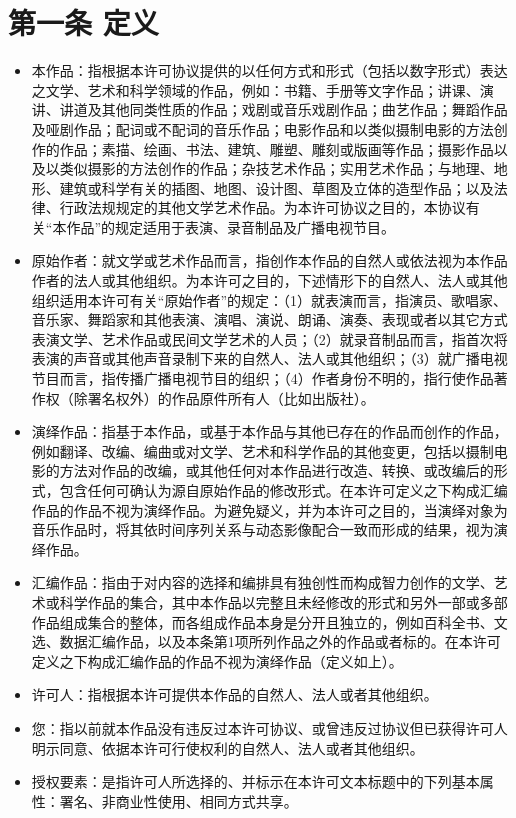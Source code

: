 \documentclass{book}
\begin{document}
\section{第一条 定义} 
\begin{itemize}
	\item 本作品：指根据本许可协议提供的以任何方式和形式（包括以数字形式）表达之文学、艺术和科学领域的作品，例如：书籍、手册等文字作品；讲课、演讲、讲道及其他同类性质的作品；戏剧或音乐戏剧作品；曲艺作品；舞蹈作品及哑剧作品；配词或不配词的音乐作品；电影作品和以类似摄制电影的方法创作的作品；素描、绘画、书法、建筑、雕塑、雕刻或版画等作品；摄影作品以及以类似摄影的方法创作的作品；杂技艺术作品；实用艺术作品；与地理、地形、建筑或科学有关的插图、地图、设计图、草图及立体的造型作品；以及法律、行政法规规定的其他文学艺术作品。为本许可协议之目的，本协议有关“本作品”的规定适用于表演、录音制品及广播电视节目。 
	\item 原始作者：就文学或艺术作品而言，指创作本作品的自然人或依法视为本作品作者的法人或其他组织。为本许可之目的，下述情形下的自然人、法人或其他组织适用本许可有关“原始作者”的规定：（1）就表演而言，指演员、歌唱家、音乐家、舞蹈家和其他表演、演唱、演说、朗诵、演奏、表现或者以其它方式表演文学、艺术作品或民间文学艺术的人员；（2）就录音制品而言，指首次将表演的声音或其他声音录制下来的自然人、法人或其他组织；（3）就广播电视节目而言，指传播广播电视节目的组织；（4）作者身份不明的，指行使作品著作权（除署名权外）的作品原件所有人（比如出版社）。
	\item 演绎作品：指基于本作品，或基于本作品与其他已存在的作品而创作的作品，例如翻译、改编、编曲或对文学、艺术和科学作品的其他变更，包括以摄制电影的方法对作品的改编，或其他任何对本作品进行改造、转换、或改编后的形式，包含任何可确认为源自原始作品的修改形式。在本许可定义之下构成汇编作品的作品不视为演绎作品。为避免疑义，并为本许可之目的，当演绎对象为音乐作品时，将其依时间序列关系与动态影像配合一致而形成的结果，视为演绎作品。
	\item 汇编作品：指由于对内容的选择和编排具有独创性而构成智力创作的文学、艺术或科学作品的集合，其中本作品以完整且未经修改的形式和另外一部或多部作品组成集合的整体，而各组成作品本身是分开且独立的，例如百科全书、文选、数据汇编作品，以及本条第1项所列作品之外的作品或者标的。在本许可定义之下构成汇编作品的作品不视为演绎作品（定义如上）。
	\item 许可人：指根据本许可提供本作品的自然人、法人或者其他组织。
	\item 您：指以前就本作品没有违反过本许可协议、或曾违反过协议但已获得许可人明示同意、依据本许可行使权利的自然人、法人或者其他组织。
	\item 授权要素：是指许可人所选择的、并标示在本许可文本标题中的下列基本属性：署名、非商业性使用、相同方式共享。

\end{itemize}
\end{document}
